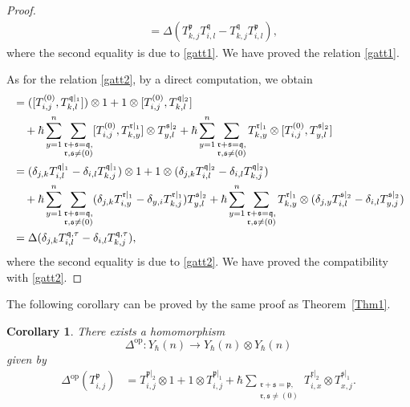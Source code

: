 \documentclass{article}
\newtheorem{Corollary}[equation]{Corollary}
\theoremstyle{definition}
\theoremstyle{remark}
\numberwithin{equation}{section}
\numberwithin{equation}{section}
\begin{document}
\begin{proof}
\begin{align*}
&=\Delta(T^{\mathfrak{p}}_{k,j}T^{\mathfrak{q}}_{i,l}-T^{\mathfrak{q}}_{k,j}T^{\mathfrak{p}}_{i,l}),
\end{align*}
where the second equality is due to \eqref{gatt1}. We have proved the relation \eqref{gatt1}.

As for the relation \eqref{gatt2}, by a direct computation, we obtain
\begin{align*}
[\Delta(T^{(0)}_{i,j}),\Delta(T^{\mathfrak{q},\tau}_{k,l})]
&=([T^{(0)}_{i,j},T^{\mathfrak{q}|_1}_{k,l}])\otimes1+1\otimes [T^{(0)}_{i,j},T^{\mathfrak{q}|_2}_{k,l}]\\
&\quad+\hbar\sum_{y=1}^n\limits\sum_{\substack{\mathfrak{r}+\mathfrak{s}=\mathfrak{q},\\\mathfrak{r},\mathfrak{s}\neq(0)}}[T^{(0)}_{i,j},T^{\mathfrak{r}|_1}_{k,y}]\otimes T^{\mathfrak{s}|_2}_{y,l}+\hbar\sum_{y=1}^n\limits\sum_{\substack{\mathfrak{r}+\mathfrak{s}=\mathfrak{q},\\\mathfrak{r},\mathfrak{s}\neq(0)}}T^{\mathfrak{r}|_1}_{k,y}\otimes [T^{(0)}_{i,j},T^{\mathfrak{s}|_2}_{y,l}]\\
&=(\delta_{j,k}T^{\mathfrak{q}|_1}_{i,l}-\delta_{i,l}T^{\mathfrak{q}|_1}_{k,j})\otimes1+1\otimes(\delta_{j,k}T^{\mathfrak{q}|_2}_{i,l}-\delta_{i,l}T^{\mathfrak{q}|_2}_{k,j})\\
&\quad+\hbar\sum_{y=1}^n\limits\sum_{\substack{\mathfrak{r}+\mathfrak{s}=\mathfrak{q},\\\mathfrak{r},\mathfrak{s}\neq(0)}}(\delta_{j,k}T^{\mathfrak{r}|_1}_{i,y}-\delta_{y,i}T^{\mathfrak{r}|_1}_{k,j})T^{\mathfrak{s}|_2}_{y,l}+\hbar\sum_{y=1}^n\limits\sum_{\substack{\mathfrak{r}+\mathfrak{s}=\mathfrak{q},\\\mathfrak{r},\mathfrak{s}\neq(0)}}T^{\mathfrak{r}|_1}_{k,y}\otimes (\delta_{j,y}T^{\mathfrak{s}|_2}_{i,l}-\delta_{i,l}T^{\mathfrak{s}|_2}_{y,j})\\
&=\Delta(\delta_{j,k}T^{\mathfrak{q},\tau}_{i,l}-\delta_{i,l}T^{\mathfrak{q},\tau}_{k,j}),
\end{align*}
where the second equality is due to \eqref{gatt2}. We have proved the compatibility with \eqref{gatt2}.
\end{proof}
The following corollary can be proved by the same proof as Theorem~\ref{Thm1}.
\begin{Corollary}
There exists a homomorphism 
\[\Delta^{\text{op}}\colon Y_\hbar(n)\to Y_\hbar(n)\otimes Y_\hbar(n)\]
given by
\begin{align*}
\Delta^{\text{op}}(T^{\mathfrak{p}}_{i,j})&=T^{\mathfrak{p}|_2}_{i,j}\otimes1+1\otimes T^{\mathfrak{p}|_1}_{i,j}+\hbar\sum_{\substack{\mathfrak{r}+\mathfrak{s}=\mathfrak{p},\\\mathfrak{r},\mathfrak{s}\neq(0)}}T^{\mathfrak{r}|_2}_{i,x}\otimes T^{\mathfrak{s}|_1}_{x,j}.
\end{align*}
\end{Corollary}
\end{document}
